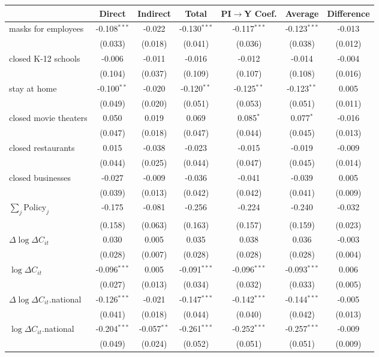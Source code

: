 
\begin{tabular}{lccccc|>{}c}
\toprule
  & Direct & Indirect & Total & PI$\to$Y Coef. & Average & Difference\\
\midrule
masks for employees & -0.108$^{***}$ & -0.022 & -0.130$^{***}$ & -0.117$^{***}$ & -0.123$^{***}$ & -0.013\\
 & (0.033) & (0.018) & (0.041) & (0.036) & (0.038) & (0.012)\\
closed K-12 schools & -0.006 & -0.011 & -0.016 & -0.012 & -0.014 & -0.004\\
 & (0.104) & (0.037) & (0.109) & (0.107) & (0.108) & (0.016)\\
stay at home & -0.100$^{**}$ & -0.020 & -0.120$^{**}$ & -0.125$^{**}$ & -0.123$^{**}$ & 0.005\\
 & (0.049) & (0.020) & (0.051) & (0.053) & (0.051) & (0.011)\\
closed movie theaters & 0.050 & 0.019 & 0.069 & 0.085$^{*}$ & 0.077$^{*}$ & -0.016\\
 & (0.047) & (0.018) & (0.047) & (0.044) & (0.045) & (0.013)\\
closed restaurants & 0.015 & -0.038 & -0.023 & -0.015 & -0.019 & -0.009\\
 & (0.044) & (0.025) & (0.044) & (0.047) & (0.045) & (0.014)\\
closed businesses & -0.027 & -0.009 & -0.036 & -0.041 & -0.039 & 0.005\\
 & (0.039) & (0.013) & (0.042) & (0.042) & (0.041) & (0.009)\\
$\sum_j \mathrm{Policy}_j$ & -0.175 & -0.081 & -0.256 & -0.224 & -0.240 & -0.032\\
 & (0.158) & (0.063) & (0.163) & (0.157) & (0.159) & (0.023)\\
$\Delta \log \Delta C_{it}$ & 0.030 & 0.005 & 0.035 & 0.038 & 0.036 & -0.003\\
 & (0.028) & (0.007) & (0.028) & (0.028) & (0.028) & (0.004)\\
$\log \Delta C_{it}$ & -0.096$^{***}$ & 0.005 & -0.091$^{***}$ & -0.096$^{***}$ & -0.093$^{***}$ & 0.006\\
 & (0.027) & (0.013) & (0.034) & (0.032) & (0.033) & (0.005)\\
$\Delta \log \Delta C_{it}$.national & -0.126$^{***}$ & -0.021 & -0.147$^{***}$ & -0.142$^{***}$ & -0.144$^{***}$ & -0.005\\
 & (0.041) & (0.018) & (0.044) & (0.040) & (0.042) & (0.013)\\
$\log \Delta C_{it}$.national & -0.204$^{***}$ & -0.057$^{**}$ & -0.261$^{***}$ & -0.252$^{***}$ & -0.257$^{***}$ & -0.009\\
 & (0.049) & (0.024) & (0.052) & (0.051) & (0.051) & (0.009)\\
\bottomrule
\end{tabular}